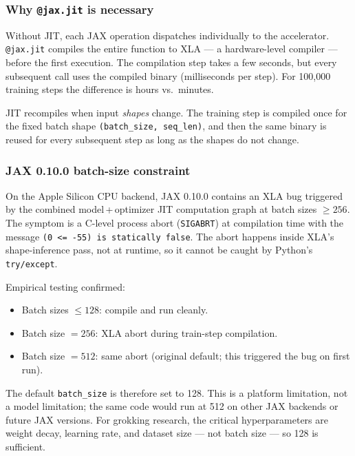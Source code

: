 \documentclass[11pt, a4paper]{article}
\begin{document}
\subsubsection{Why \texttt{@jax.jit} is necessary}

Without JIT, each JAX operation dispatches individually to the accelerator.
\texttt{@jax.jit} compiles the entire function to XLA --- a hardware-level
compiler --- before the first execution. The compilation step takes a few
seconds, but every subsequent call uses the compiled binary (milliseconds per
step). For 100{,}000 training steps the difference is hours vs.\ minutes.

JIT recompiles when input \emph{shapes} change. The training step is compiled
once for the fixed batch shape \texttt{(batch\_size, seq\_len)}, and then the
same binary is reused for every subsequent step as long as the shapes do not
change.

\subsubsection{JAX 0.10.0 batch-size constraint}
\label{sec:xla-bug}

On the Apple Silicon CPU backend, JAX 0.10.0 contains an XLA bug triggered by
the combined model\,+\,optimizer JIT computation graph at batch sizes $\geq 256$.
The symptom is a C-level process abort (\texttt{SIGABRT}) at compilation time
with the message \texttt{(0 <= -55) is statically false}. The abort happens
inside XLA's shape-inference pass, not at runtime, so it cannot be caught by
Python's \texttt{try/except}.

Empirical testing confirmed:
\begin{itemize}[noitemsep]
  \item Batch sizes $\leq 128$: compile and run cleanly.
  \item Batch size $= 256$: XLA abort during train-step compilation.
  \item Batch size $= 512$: same abort (original default; this triggered the bug
        on first run).
\end{itemize}

The default \texttt{batch\_size} is therefore set to 128. This is a platform
limitation, not a model limitation; the same code would run at 512 on other
JAX backends or future JAX versions. For grokking research, the critical
hyperparameters are weight decay, learning rate, and dataset size --- not batch
size --- so 128 is sufficient.
\end{document}
